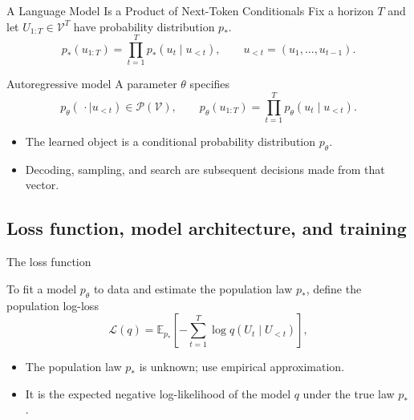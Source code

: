 \documentclass[aspectratio=169,11pt]{beamer}
\newcommand{\E}{\mathbb{E}}
\newcommand{\cP}{\mathcal{P}}
\begin{document}
\begin{frame}{A Language Model Is a Product of Next-Token Conditionals}
Fix a horizon $T$ and let $U_{1:T} \in \mathcal V^T$ have probability distribution $p_*$. 
\begin{equation*}
 p_*(u_{1:T})
 =\prod_{t=1}^T p_*(u_t\mid u_{<t}),
 \qquad u_{<t}=(u_1,\ldots,u_{t-1}).
\end{equation*}

\begin{block}{Autoregressive model}
A parameter $\theta$ specifies
\[
 p_\theta(\,\cdot\mid u_{<t})\in\cP(\mathcal V),
 \qquad
 p_\theta(u_{1:T})
 =\prod_{t=1}^T p_\theta(u_t\mid u_{<t}).
\]
\end{block}
\begin{itemize}
  \item The learned object is a conditional probability distribution $p_\theta$.
  \item  Decoding, sampling, and search are subsequent decisions made from that vector.
\end{itemize}
\end{frame}



\subsection{Loss function, model architecture, and training}
\begin{frame}{The loss function}

To fit a model $p_\theta$ to data and estimate the population law $p_*$, define the population log-loss
\[
 \mathcal L(q)=\E_{p_*}\!\left[-\sum_{t=1}^T
     \log q(U_t\mid U_{<t})\right],
\]
\begin{itemize}
  \item The population law $p_*$ is unknown; use empirical approximation.
  \item It is the expected negative log-likelihood of the model $q$ under the true law $p_*$.
\end{itemize}

\end{frame}
\end{document}
